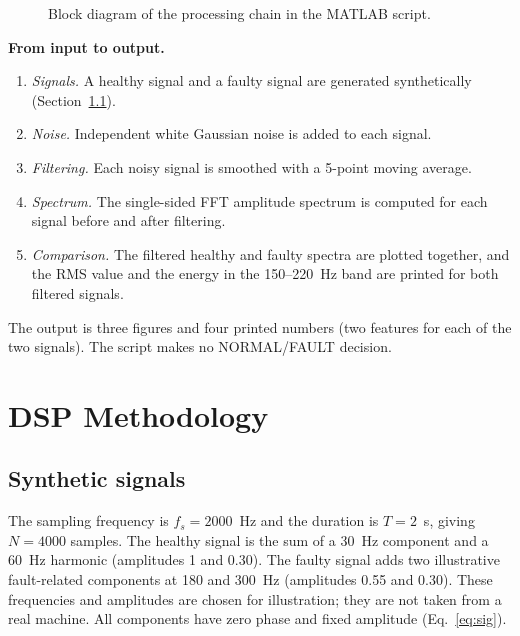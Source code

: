 \documentclass[10pt,twocolumn,a4paper]{article}
\begin{document}
\begin{figure}[t]
\centering
{}
\caption{Block diagram of the processing chain in the MATLAB script.}\label{fig:block}
\end{figure}

\textbf{From input to output.}
\begin{enumerate}
\item \emph{Signals.} A healthy signal and a faulty signal are generated synthetically (Section~\ref{sec:signals}).
\item \emph{Noise.} Independent white Gaussian noise is added to each signal.
\item \emph{Filtering.} Each noisy signal is smoothed with a 5-point moving average.
\item \emph{Spectrum.} The single-sided FFT amplitude spectrum is computed for each signal before and after filtering.
\item \emph{Comparison.} The filtered healthy and faulty spectra are plotted together, and the RMS value and the energy in the 150--220~Hz band are printed for both filtered signals.
\end{enumerate}
The output is three figures and four printed numbers (two features for each of the two signals). The script makes no NORMAL/FAULT decision.

\section{DSP Methodology}
\subsection{Synthetic signals}\label{sec:signals}
The sampling frequency is $f_s=2000$~Hz and the duration is $T=2$~s, giving $N=4000$ samples. The healthy signal is the sum of a
30~Hz component and a 60~Hz harmonic (amplitudes 1 and 0.30). The faulty signal adds two illustrative fault-related components at 180 and
300~Hz (amplitudes 0.55 and 0.30). These frequencies and amplitudes are chosen for illustration; they are not taken from a real
machine. All components have zero phase and fixed amplitude (Eq.~\ref{eq:sig}).
\end{document}
